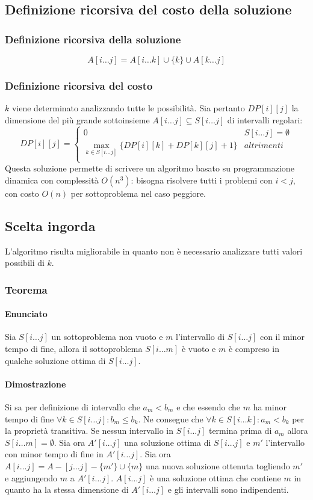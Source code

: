 \subsection{Definizione ricorsiva del costo della soluzione}
\subsubsection{Definizione ricorsiva della soluzione}
$$A[i\dots j] = A[i\dots k] \cup \{k\}\cup A[k\dots j]$$
\subsubsection{Definizione ricorsiva del costo}
$k$ viene determinato analizzando tutte le possibilit\`a. Sia pertanto $DP[i][j]$ la dimensione del pi\`u grande sottoinsieme $A[i\dots j]\subseteq S[i\dots j]$ di intervalli regolari:
$$ DP[i][j] = \begin{cases}
	0 & S[i\dots j] = \emptyset\\
	\max\limits_{k\in S[i\dots j]}\{DP[i][k]+DP[k][j]+1\} & altrimenti\\
\end{cases}$$
Questa soluzione permette di scrivere un algoritmo basato su programmazione dinamica con complessit\`a $O(n^3)$: bisogna risolvere tutti i problemi con $i<j$, con costo $O(n)$ per 
sottoproblema nel caso peggiore.
\subsection{Scelta ingorda}
L'algoritmo risulta migliorabile in quanto non \`e necessario analizzare tutti valori possibili di $k$.
\subsubsection{Teorema}
\paragraph{Enunciato}
Sia $S[i\dots j]$ un sottoproblema non vuoto e $m$ l'intervallo di $S[i\dots j]$ con il minor tempo di fine, allora il sottoproblema $S[i\dots m]$ \`e vuoto e $m$ \`e compreso in 
qualche soluzione ottima di $S[i\dots j]$.
\paragraph{Dimostrazione}
Si sa per definizione di intervallo che $a_m<b_m$ e che essendo che $m$ ha minor tempo di fine $\forall k\in S[i\dots j]:b_m\le b_k$. Ne consegue che $\forall k\in S[i\dots k]:a_m<b_k$
per la propriet\`a transitiva. Se nessun intervallo in $S[i\dots j]$ termina prima di $a_m$ allora $S[i\dots m] = \emptyset$. Sia ora $A'[i\dots j]$ una soluzione ottima di $S[i\dots j]$
e $m'$ l'intervallo con minor tempo di fine in $A'[i\dots j]$. Sia ora $A[i\dots j] = A-[j\dots j]-\{m'\}\cup \{m\}$ una nuova soluzione ottenuta togliendo $m'$ e aggiungendo $m$ a
$A'[i\dots j]$. $A[i\dots j]$ \`e una soluzione ottima che contiene $m$ in quanto ha la stessa dimensione di $A'[i\dots j]$ e gli intervalli sono indipendenti. 
